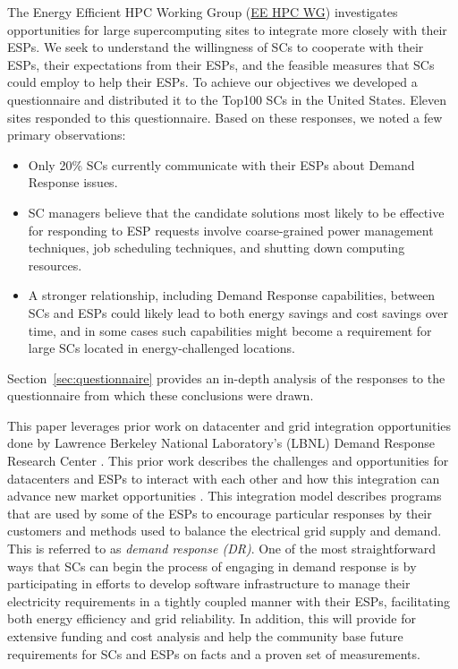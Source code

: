 The Energy Efficient HPC Working Group (\href {http://eehpcwg.lbl.gov/}{EE HPC WG})  
investigates opportunities for large supercomputing sites to  
integrate more closely with their ESPs.
We seek to understand the willingness of SCs to
cooperate with their ESPs, their expectations from their ESPs, and the feasible measures
that SCs could employ to help their ESPs.
To achieve our objectives we developed a questionnaire and distributed it to 
the Top100 SCs in the United States. 
Eleven sites responded to this questionnaire.  Based on these responses, we noted a few
primary observations:
\begin{itemize}
\item Only 20\% SCs currently communicate with their ESPs about Demand Response issues.
\item SC managers believe that the candidate solutions most likely to be effective for
responding to ESP requests involve coarse-grained power management techniques, job
scheduling techniques, and shutting down computing resources.
\item A stronger relationship, including Demand Response capabilities, between SCs and
ESPs could likely lead to both energy savings and cost savings over time, and in some
cases such capabilities might become a requirement for large SCs located in energy-challenged
locations.
\end{itemize}
Section~\ref{sec:questionnaire} provides an in-depth analysis of the responses to the
questionnaire from which these conclusions were drawn.

This paper %
leverages prior work on datacenter and grid integration opportunities
done by Lawrence Berkeley National Laboratory's (LBNL) Demand Response 
Research Center \cite{LBNL}. This prior work describes the challenges and opportunities for datacenters and %
ESPs to interact with each other and how this integration can advance 
new market opportunities \cite{Ghatikar2012a, Ghatikar2012b}. 
This integration model describes programs that are used by some of the ESPs %
to encourage particular responses by their customers and methods 
used to balance the electrical grid supply and demand. This is referred to as \emph{demand response (DR)}.
One of the most straightforward ways that SCs can begin
the process of engaging %
in demand response is by participating in efforts to
develop software 
infrastructure to manage their electricity requirements in a tightly coupled manner 
with their ESPs, facilitating both energy efficiency and grid reliability. In addition, this will provide for extensive funding and cost analysis and help the community base future requirements for SCs and ESPs on facts and a proven set of measurements.

